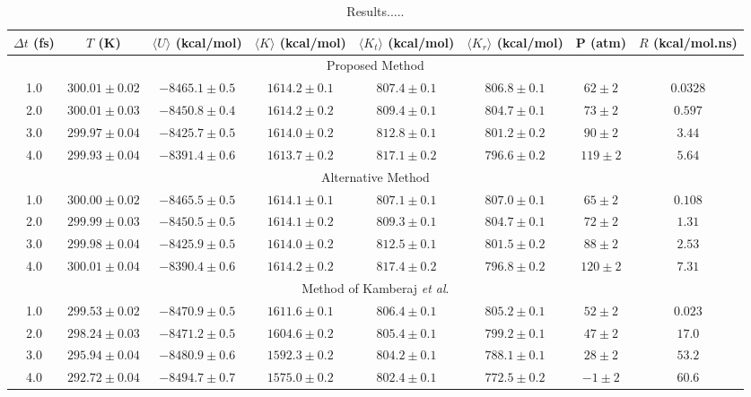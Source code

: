 \documentclass[aip,jcp,reprint,amsmath,amssymb]{revtex4-1}
\begin{document}
\begin{table}
\caption{Results.....}
\label{table:proposed_method}
\begin{ruledtabular}
\begin{tabular}{cccccccc}
$\Delta t$ (fs) & $T$ (K) & $\langle U\rangle$ (kcal/mol) & $\langle K\rangle$ (kcal/mol) & $\langle K_t\rangle$ (kcal/mol) & $\langle K_r\rangle$ (kcal/mol) & P (atm) & $R$ (kcal/mol.ns) \\

\hline
\multicolumn{8}{c}{Proposed Method} \\
1.0 & $300.01\pm0.02$ & $-8465.1\pm0.5$ & $1614.2\pm0.1$ & $807.4\pm0.1$ & $806.8\pm0.1$ & $62\pm2$ & $0.0328$ \\
2.0 & $300.01\pm0.03$ & $-8450.8\pm0.4$ & $1614.2\pm0.2$ & $809.4\pm0.1$ & $804.7\pm0.1$ & $73\pm2$ & $0.597$ \\
3.0 & $299.97\pm0.04$ & $-8425.7\pm0.5$ & $1614.0\pm0.2$ & $812.8\pm0.1$ & $801.2\pm0.2$ & $90\pm2$ & $3.44$ \\
4.0 & $299.93\pm0.04$ & $-8391.4\pm0.6$ & $1613.7\pm0.2$ & $817.1\pm0.2$ & $796.6\pm0.2$ & $119\pm2$ & $5.64$ \\

\hline
\multicolumn{8}{c}{Alternative Method} \\
1.0 & $300.00\pm0.02$ & $-8465.5\pm0.5$ & $1614.1\pm0.1$ & $807.1\pm0.1$ & $807.0\pm0.1$ & $65\pm2$ & $0.108$ \\
2.0 & $299.99\pm0.03$ & $-8450.5\pm0.5$ & $1614.1\pm0.2$ & $809.3\pm0.1$ & $804.7\pm0.1$ & $72\pm2$ & $1.31$ \\
3.0 & $299.98\pm0.04$ & $-8425.9\pm0.5$ & $1614.0\pm0.2$ & $812.5\pm0.1$ & $801.5\pm0.2$ & $88\pm2$ & $2.53$ \\
4.0 & $300.01\pm0.04$ & $-8390.4\pm0.6$ & $1614.2\pm0.2$ & $817.4\pm0.2$ & $796.8\pm0.2$ & $120\pm2$ & $7.31$ \\

\hline
\multicolumn{8}{c}{Method of Kamberaj \textit{et al}.\cite{Kamberaj2005}} \\
1.0 & $299.53\pm0.02$ & $-8470.9\pm0.5$ & $1611.6\pm0.1$ & $806.4\pm0.1$ & $805.2\pm0.1$ & $52\pm2$ & $0.023$ \\
2.0 & $298.24\pm0.03$ & $-8471.2\pm0.5$ & $1604.6\pm0.2$ & $805.4\pm0.1$ & $799.2\pm0.1$ & $47\pm2$ & $17.0$ \\
3.0 & $295.94\pm0.04$ & $-8480.9\pm0.6$ & $1592.3\pm0.2$ & $804.2\pm0.1$ & $788.1\pm0.1$ & $28\pm2$ & $53.2$ \\
4.0 & $292.72\pm0.04$ & $-8494.7\pm0.7$ & $1575.0\pm0.2$ & $802.4\pm0.1$ & $772.5\pm0.2$ & $-1\pm2$ & $60.6$ \\


\end{tabular}
\end{ruledtabular}
\end{table}
\end{document}

